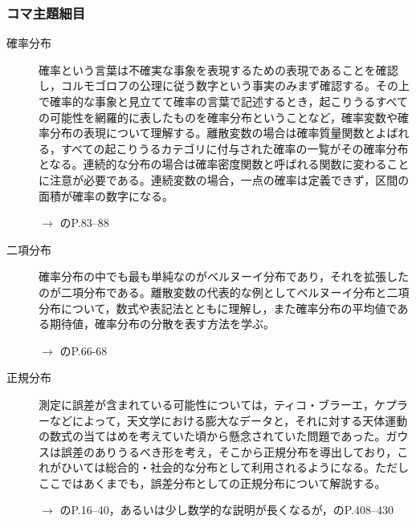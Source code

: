 \subsubsection{コマ主題細目}
\begin{description}


	\item[確率分布]確率という言葉は不確実な事象を表現するための表現であることを確認し，コルモゴロフの公理に従う数字という事実のみまず確認する。その上で確率的な事象と見立てて確率の言葉で記述するとき，起こりうるすべての可能性を網羅的に表したものを確率分布ということなど，確率変数や確率分布の表現について理解する。離散変数の場合は確率質量関数とよばれる，すべての起こりうるカテゴリに付与された確率の一覧がその確率分布となる。連続的な分布の場合は確率密度関数と呼ばれる関数に変わることに注意が必要である。連続変数の場合，一点の確率は定義できず，区間の面積が確率の数字になる。
	      \begin{flushright}
		      $\to$ \citet{Maeda2017}のP.83--88
	      \end{flushright}

	\item[二項分布]確率分布の中でも最も単純なのがベルヌーイ分布であり，それを拡張したのが二項分布である。離散変数の代表的な例としてベルヌーイ分布と二項分布について，数式や表記法とともに理解し，また確率分布の平均値である期待値，確率分布の分散を表す方法を学ぶ。
	      \begin{flushright}
		      $\to$ \citet{Nojima201903}のP.66-68
	      \end{flushright}

	\item[正規分布]測定に誤差が含まれている可能性については，ティコ・ブラーエ，ケプラーなどによって，天文学における膨大なデータと，それに対する天体運動の数式の当てはめを考えていた頃から懸念されていた問題であった。ガウスは誤差のありうるべき形を考え，そこから正規分布を導出しており，これがひいては総合的・社会的な分布として利用されるようになる。ただしここではあくまでも，誤差分布としての正規分布について解説する。
	      \begin{flushright}
		      $\to$ \citet{Naganuma2201611}のP.16--40，あるいは少し数学的な説明が長くなるが，\citet{Nishiuchi201712}のP.408--430
	      \end{flushright}


\end{description}
